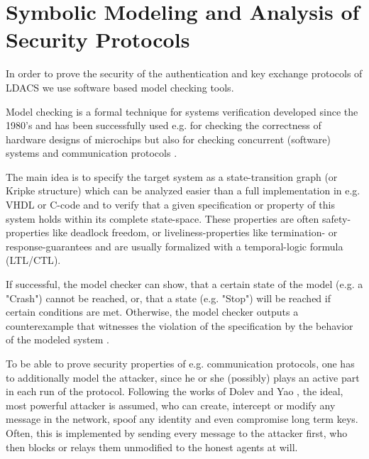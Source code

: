 \section{Symbolic Modeling and Analysis of Security Protocols}
\label{Method_modelchecking}


In order to prove the security of the authentication and key exchange protocols of \ac{LDACS} we use software based model checking tools.

Model checking is a formal technique for systems verification developed since the 1980's \cite{clarke1983} and has been successfully used e.g. for checking the correctness of hardware designs of microchips \cite{cimatti1999} but also for checking concurrent (software) systems and communication protocols \cite{holzmann1991}.

The main idea is to specify the target system as a state-transition graph (or Kripke structure) which can be analyzed easier than a full implementation in e.g. \ac{VHDL} or C-code and to verify that a given specification or property of this system holds within its complete state-space. These properties are often safety-properties like deadlock freedom, or liveliness-properties like termination- or response-guarantees and are usually formalized with a temporal-logic formula (\ac{LTL}/\ac{CTL}).

If successful, the model checker can show, that a certain state of the model (e.g. a "Crash") cannot be reached, or, that a state (e.g. "Stop") will be reached if certain conditions are met. Otherwise, the model checker outputs a counterexample that witnesses the violation of the specification by the behavior of the modeled system \cite{clarke2018}.

To be able to prove security properties of e.g. communication protocols, one has to additionally model the attacker, since he or she (possibly) plays an active part in each run of the protocol. Following the works of Dolev and Yao \cite{dolev1981}, the ideal, most powerful attacker is assumed, who can create, intercept or modify any message in the network, spoof any identity and even compromise long term keys. Often, this is implemented by sending every message to the attacker first, who then blocks or relays them unmodified to the honest agents at will.

